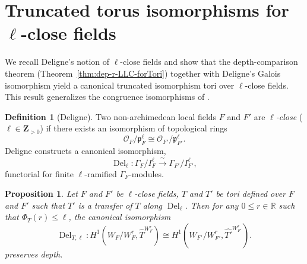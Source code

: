 \documentclass[american]{article}
\numberwithin{equation}{section}
\numberwithin{figure}{section}
\theoremstyle{plain}
\newtheorem{proposition}[theorem]{Proposition}
\theoremstyle{definition}
\newtheorem{definition}[theorem]{Definition}
\theoremstyle{remark}
\newcommand{\scrO}{\mathscr{O}}
\newcommand{\fracp}{\mathfrak{p}}
\begin{document}
\section{Truncated torus isomorphisms for $\ell$-close fields}
\label{sec:ell-close}

We recall Deligne's notion of $\ell$-close fields and show that the depth-comparison theorem (Theorem~\ref{thm:dep-r-LLC-forTori}) together with Deligne's Galois isomorphism yield a canonical truncated isomorphism tori over $\ell$-close fields. This result generalizes the congruence isomorphisms of \cite[Th.~1.1.1]{AV24}.

\begin{definition}[Deligne]\label{def:ell-close} 
Two non-archimedean local fields $F$ and $F'$ are \emph{$\ell$-close} ($\ell\in\mathbf{Z}_{>0}$) if there exists an isomorphism of topological rings 
\[
\scrO_{F}/\fracp_{F}^{\ell} \cong \scrO_{F'}/\fracp_{F'}^{\ell}.
\]
Deligne \cite{Deligne84} constructs a canonical isomorphism,
\[
\operatorname{Del}_{\ell}:\Gamma_{F}/I_{F}^{\ell} \xrightarrow{\;\sim\;} \Gamma_{F'}/I_{F'}^{\ell},
\]
functorial for finite $\ell$-ramified $\Gamma_{F}$-modules. 
\end{definition}
\begin{proposition}\label{prop:H1-dep-preserve}
    Let \(F\) and \(F'\) be \(\ell\)-close fields, \(T\) and \(T'\) be tori defined over \(F\) and \(F'\) such that \(T'\) is a transfer of  \(T\) along \(\operatorname{Del}_{\ell}\). Then for any $0\leq r\in \mathbb{R}$ such that $\Phi_T(r)\leq \ell$, the canonical isomorphism 
    \[
   \operatorname{Del}_{T,\ell}: H^1(W_F/W_F^r,\widehat{T}^{W_F^r})\cong  H^1(W_{F'}/W_{F'}^r,\widehat{T'}^{W_{F'}^r}).
    \]
    preserves depth. 
\end{proposition}
\end{document}
